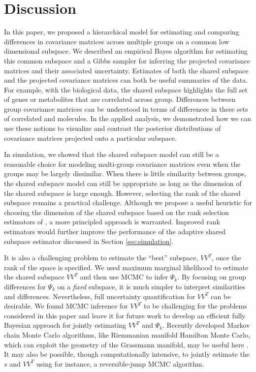 \documentclass[12pt]{article}
\begin{document}
\section{Discussion}

In this paper, we proposed a hierarchical model for estimating and
comparing differences in covariance matrices across multiple groups on
a common low dimensional subspace.  We described an empirical Bayes
algorithm for estimating this common subspace and a Gibbs sampler for
inferring the projected covariance matrices and their associated
uncertainty.  Estimates of both the shared subspace and the projected
covariance matrices can both be useful summaries of the data.  For
example, with the biological data, the shared subspace highlights the
full set of genes or metabolites that are correlated across group.
Differences between group covariance matrices can be understood in
terms of differences in these sets of correlated and
molecules.  In the applied analysis, we demonstrated how
we can use these notions to visualize and contrast the posterior
distributions of covariance matrices projected onto a particular
subspace.

In simulation, we showed that the shared subspace model can still be a
reasonable choice for modeling multi-group covariance matrices even
when the groups may be largely dissimilar.  When there is little
similarity between groups, the shared subspace model can still be appropriate as
long as the dimension of the shared subspace is large enough.
However, selecting the rank of the shared subspace remains a practical
challenge.  Although we propose a useful heuristic for choosing the
dimension of the shared subspace based on the rank selection
estimators of \citet{Gavish2014}, a more principled approach is
warranted.  Improved rank estimators would further improve the
performance of the adaptive shared subspace estimator discussed in
Section \ref{sec:simulation}.

It is also a challenging problem to estimate the ``best'' subspace,
$VV^T$, once the rank of the space is specified.  We used maximum
marginal likelihood to estimate the shared subspace $VV^T$ and then
use MCMC to infer $\Psi_k$.  By focusing on
group differences for $\Psi_k$ on a \emph{fixed} subspace, it is much
simpler to interpret similarities and differences.  Nevertheless, full
uncertainty quantification for $VV^T$ can be desirable.  We found
MCMC inference for $VV^T$ to be challenging for the problems considered
in this paper and leave it for future work to develop an efficient
fully Bayesian approach for jointly estimating $VV^T$ and $\Psi_k$.
Recently developed Markov chain Monte Carlo algorithms, like Riemmanian manifold
Hamilton Monte Carlo, which can exploit the geometry of the Grassmann
manifold, may be useful here \citep{Byrne2013, Girolami2011}.  It may
also be possible, though computationally intensive, to jointly
estimate the $s$ and $VV^T$ using for instance, a
reversible-jump MCMC algorithm.
\end{document}
